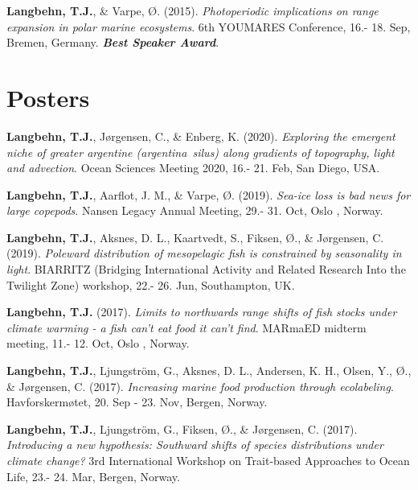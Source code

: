 \documentclass[11pt, a4paper]{awesome-cv}
\begin{document}
\leavevmode\hypertarget{ref-Langbehn1}{}%
\textbf{Langbehn, T.J.}, \& Varpe, Ø. (2015). \emph{Photoperiodic
implications on range expansion in polar marine ecosystems}. 6th
YOUMARES Conference, 16.- 18. Sep, Bremen, Germany. \emph{\textbf{Best
Speaker Award}}.

\endgroup

\hypertarget{posters}{%
\section{Posters}\label{posters}}

\begingroup
\setlength{\parindent}{-0.5in}
\setlength{\leftskip}{0.5in}

\hypertarget{refs_posters}{}
\leavevmode\hypertarget{ref-Langbehn12}{}%
\textbf{Langbehn, T.J.}, Jørgensen, C., \& Enberg, K. (2020).
\emph{Exploring the emergent niche of greater argentine
(argentina~silus) along gradients of topography, light and advection}.
Ocean Sciences Meeting 2020, 16.- 21. Feb, San Diego, USA.

\leavevmode\hypertarget{ref-Langbehn11}{}%
\textbf{Langbehn, T.J.}, Aarflot, J. M., \& Varpe, Ø. (2019).
\emph{Sea-ice loss is bad news for large copepods}. Nansen Legacy Annual
Meeting, 29.- 31. Oct, Oslo , Norway.

\leavevmode\hypertarget{ref-Langbehn10}{}%
\textbf{Langbehn, T.J.}, Aksnes, D. L., Kaartvedt, S., Fiksen, Ø., \&
Jørgensen, C. (2019). \emph{Poleward distribution of mesopelagic fish is
constrained by seasonality in light}. BIARRITZ (Bridging International
Activity and Related Research Into the Twilight Zone) workshop, 22.- 26.
Jun, Southampton, UK.

\leavevmode\hypertarget{ref-Langbehn9}{}%
\textbf{Langbehn, T.J.} (2017). \emph{Limits to northwards range shifts
of fish stocks under climate warming - a fish can't eat food it can't
find}. MARmaED midterm meeting, 11.- 12. Oct, Oslo , Norway.

\leavevmode\hypertarget{ref-Langbehn8}{}%
\textbf{Langbehn, T.J.}, Ljungström, G., Aksnes, D. L., Andersen, K. H.,
Olsen, Y., Ø., \& Jørgensen, C. (2017). \emph{Increasing marine food
production through ecolabeling}. Havforskermøtet, 20. Sep - 23. Nov,
Bergen, Norway.

\leavevmode\hypertarget{ref-Langbehn7}{}%
\textbf{Langbehn, T.J.}, Ljungström, G., Fiksen, Ø., \& Jørgensen, C.
(2017). \emph{Introducing a new hypothesis: Southward shifts of species
distributions under climate change?} 3rd International Workshop on
Trait-based Approaches to Ocean Life, 23.- 24. Mar, Bergen, Norway.
\end{document}
